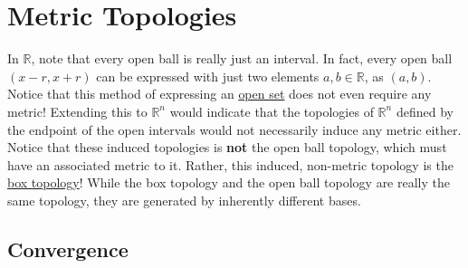 \section{Metric Topologies}

  In $\mathbb{R}$, note that every open ball is really just an interval. In fact, every open ball $(x - r, x + r)$ can be expressed with just two elements $a, b \in \mathbb{R}$, as $(a, b)$. Notice that this method of expressing an \hyperref[def:open-set]{open set} does not even require any metric! Extending this to $\mathbb{R}^n$ would indicate that the topologies of $\mathbb{R}^n$ defined by the endpoint of the open intervals would not necessarily induce any metric either. Notice that these induced topologies is \textbf{not} the open ball topology, which must have an associated metric to it. Rather, this induced, non-metric topology is the \hyperref[def:box-topology]{box topology}! While the box topology and the open ball topology are really the same topology, they are generated by inherently different bases. 

\subsection{Convergence}

